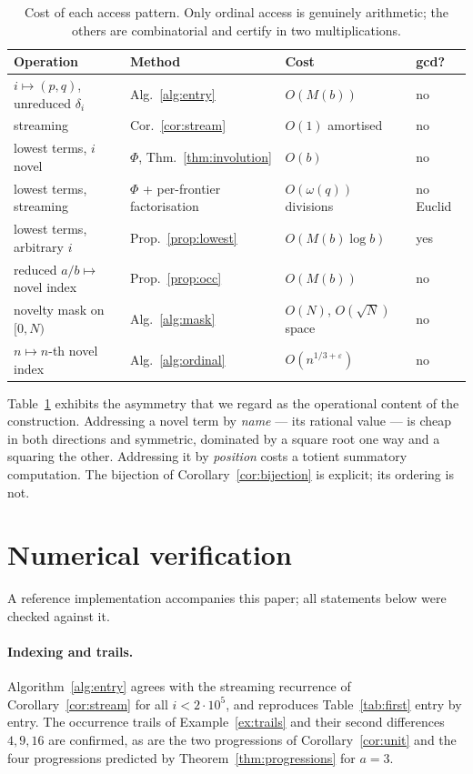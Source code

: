 \documentclass[11pt,a4paper]{article}
\theoremstyle{plain}
\theoremstyle{definition}
\theoremstyle{remark}
\begin{document}
\begin{table}[t]
\centering
\caption{Cost of each access pattern. Only ordinal access is genuinely
arithmetic; the others are combinatorial and certify in two multiplications.}
\label{tab:costs}
\begin{tabular}{llll}
\toprule
Operation & Method & Cost & gcd? \\
\midrule
$i \mapsto (p,q)$, unreduced $\delta_i$ & Alg.~\ref{alg:entry} & $O(M(b))$ & no \\
streaming & Cor.~\ref{cor:stream} & $O(1)$ amortised & no \\
lowest terms, $i$ novel & $\Phi$, Thm.~\ref{thm:involution} & $O(b)$ & no \\
lowest terms, streaming & $\Phi$ + per-frontier factorisation & $O(\omega(q))$ divisions & no Euclid \\
lowest terms, arbitrary $i$ & Prop.~\ref{prop:lowest} & $O(M(b)\log b)$ & yes \\
reduced $a/b \mapsto$ novel index & Prop.~\ref{prop:occ} & $O(M(b))$ & no \\
novelty mask on $[0,N)$ & Alg.~\ref{alg:mask} & $O(N)$, $O(\sqrt N)$ space & no \\
$n \mapsto n$-th novel index & Alg.~\ref{alg:ordinal} & $O(n^{1/3+\varepsilon})$ & no \\
\bottomrule
\end{tabular}
\end{table}

Table~\ref{tab:costs} exhibits the asymmetry that we regard as the operational
content of the construction. Addressing a novel term by \emph{name} --- its
rational value --- is cheap in both directions and symmetric, dominated by a
square root one way and a squaring the other. Addressing it by \emph{position}
costs a totient summatory computation. The bijection of
Corollary~\ref{cor:bijection} is explicit; its ordering is not.

\section{Numerical verification}
\label{sec:numerics}

A reference implementation accompanies this paper; all statements below were
checked against it.

\paragraph{Indexing and trails.} Algorithm~\ref{alg:entry} agrees with the
streaming recurrence of Corollary~\ref{cor:stream} for all $i < 2\cdot10^5$, and
reproduces Table~\ref{tab:first} entry by entry. The occurrence trails of
Example~\ref{ex:trails} and their second differences $4,9,16$ are confirmed, as
are the two progressions of Corollary~\ref{cor:unit} and the four progressions
predicted by Theorem~\ref{thm:progressions} for $a = 3$.
\end{document}
